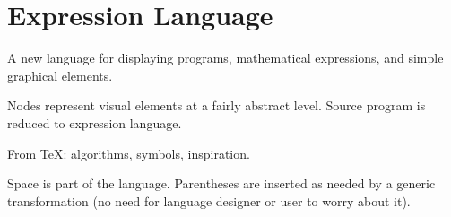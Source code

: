 \section{Expression Language}
\label{expr}

A new language for displaying programs, mathematical expressions, and simple graphical elements.

Nodes represent visual elements at a fairly abstract level. Source program is reduced to expression language.

From \TeX: algorithms, symbols, inspiration.

Space is part of the language. Parentheses are inserted as needed by a generic transformation (no need for language designer or user to worry about it).

